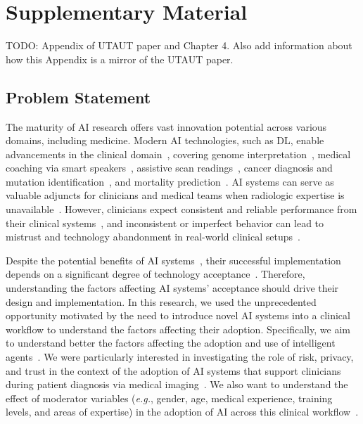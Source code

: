 \chapter{Supplementary Material}
\label{chap:app003}

TODO: Appendix of UTAUT paper and Chapter 4. Also add information about how this Appendix is a mirror of the UTAUT paper.

\clearpage

\section{Problem Statement}
\label{chap:app003001}

The maturity of \ac{AI} research offers vast innovation potential across various domains, including medicine.
Modern AI technologies, such as \ac{DL}, enable advancements in the clinical domain~\cite{topol2019high}, covering genome interpretation~\cite{sundaram2018predicting}, medical coaching via smart speakers~\cite{bickmore2018patient}, assistive scan readings~\cite{madani2018deep}, cancer diagnosis and mutation identification~\cite{coudray2018classification}, and mortality prediction~\cite{ahmad2018death}.
\ac{AI} systems can serve as valuable adjuncts for clinicians and medical teams when radiologic expertise is unavailable~\cite{doi:10.1148/radiol.2020201874, doi:10.1148/radiol.2020190283}.
However, clinicians expect consistent and reliable performance from their clinical systems~\cite{hoff2015trust, Kocielnik:2019:YAI:3290605.3300641}, and inconsistent or imperfect behavior can lead to mistrust and technology abandonment in real-world clinical setups~\cite{benrimoh2018aifred, CALISTO2021102607, CALISTO2022102285}.

Despite the potential benefits of AI systems~\cite{10.1145/3290605.3300233}, their successful implementation depends on a significant degree of technology acceptance~\cite{calisto2019midaaiarfuv, https://doi.org/10.13140/rg.2.2.25412.68486}.
Therefore, understanding the factors affecting AI systems' acceptance should drive their design and implementation.
In this research, we used the unprecedented opportunity motivated by the need to introduce novel AI systems into a clinical workflow to understand the factors affecting their adoption.
Specifically, we aim to understand better the factors affecting the adoption and use of intelligent agents~\cite{JUNGMANN2021834, doi:10.1200/CCI.20.00148, info:doi/10.2196/12422}.
We were particularly interested in investigating the role of risk, privacy, and trust in the context of the adoption of AI systems that support clinicians during patient diagnosis via medical imaging~\cite{CALISTO2021102607, Kocielnik:2019:YAI:3290605.3300641}.
We also want to understand the effect of moderator variables ({\it e.g.}, gender, age, medical experience, training levels, and areas of expertise) in the adoption of AI across this clinical workflow~\cite{Fan2020}.

